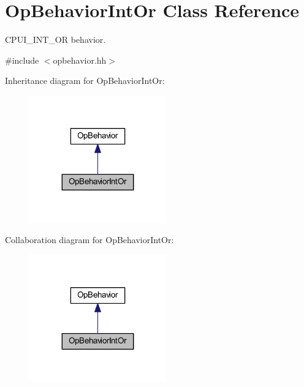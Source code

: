 \hypertarget{class_op_behavior_int_or}{}\section{Op\+Behavior\+Int\+Or Class Reference}
\label{class_op_behavior_int_or}


C\+P\+U\+I\+\_\+\+I\+N\+T\+\_\+\+OR behavior.  




{\ttfamily \#include $<$opbehavior.\+hh$>$}



Inheritance diagram for Op\+Behavior\+Int\+Or\+:
\nopagebreak
\begin{figure}[H]
\begin{center}
\leavevmode
\includegraphics[width=167pt]{class_op_behavior_int_or__inherit__graph}
\end{center}
\end{figure}


Collaboration diagram for Op\+Behavior\+Int\+Or\+:
\nopagebreak
\begin{figure}[H]
\begin{center}
\leavevmode
\includegraphics[width=167pt]{class_op_behavior_int_or__coll__graph}
\end{center}
\end{figure}
